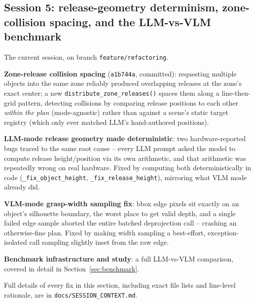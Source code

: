 \subsection{Session 5: release-geometry determinism, zone-collision spacing, and the LLM-vs-VLM benchmark}

The current session, on branch \texttt{feature/refactoring}.

\textbf{Zone-release collision spacing} (\texttt{a1b744a}, committed):
requesting multiple objects into the same zone reliably produced overlapping
releases at the zone's exact center; a new
\texttt{distribute\_zone\_releases()} spaces them along a line-then-grid
pattern, detecting collisions by comparing release positions to each other
\emph{within the plan} (mode-agnostic) rather than against a scene's static
target registry (which only ever matched LLM's hand-authored positions).

\textbf{LLM-mode release geometry made deterministic}: two hardware-reported
bugs traced to the same root cause -- every LLM prompt asked the model to
compute release height/position via its own arithmetic, and that arithmetic
was repeatedly wrong on real hardware. Fixed by computing both
deterministically in code (\texttt{\_fix\_object\_height},
\texttt{\_fix\_release\_height}), mirroring what VLM mode already did.

\textbf{VLM-mode grasp-width sampling fix}: bbox edge pixels sit exactly on
an object's silhouette boundary, the worst place to get valid depth, and a
single failed edge sample aborted the entire batched deprojection call --
crashing an otherwise-fine plan. Fixed by making width sampling a
best-effort, exception-isolated call sampling slightly inset from the raw
edge.

\textbf{Benchmark infrastructure and study}: a full LLM-vs-VLM comparison,
covered in detail in Section~\ref{sec:benchmark}.

Full details of every fix in this section, including exact file lists and
line-level rationale, are in \texttt{docs/SESSION\_CONTEXT.md}.
